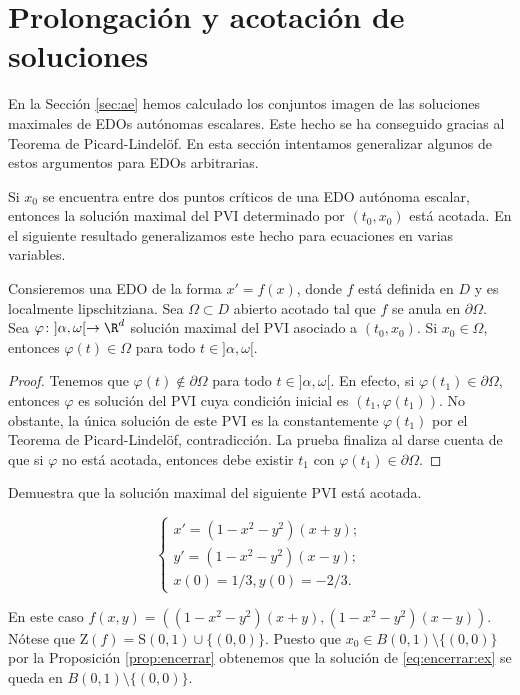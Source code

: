 \documentclass{article}
\begin{document}
\newpage

\section{Prolongación y acotación de soluciones}

En la Sección \ref{sec:ae} hemos calculado los conjuntos imagen de las soluciones maximales de EDOs
autónomas escalares. Este hecho se ha conseguido gracias al Teorema de Picard-Lindelöf. En esta
sección intentamos generalizar algunos de estos argumentos para EDOs arbitrarias.

Si $x_0$ se encuentra entre dos puntos críticos de una EDO autónoma escalar, entonces la solución
maximal del PVI determinado por $(t_0, x_0)$ está acotada. En el siguiente resultado generalizamos
este hecho para ecuaciones en varias variables.

\begin{proposition} \label{prop:encerrar} Consieremos una EDO de la forma $x' = f(x)$, donde $f$
  está definida en $D$ y es localmente lipschitziana. Sea $\Omega \subset D$ abierto acotado tal que
  $f$ se anula en $\partial\Omega$. Sea $\varphi \colon ]\alpha, \omega[ \to \R^d$ solución
  maximal del PVI asociado a $(t_0, x_0)$. Si $x_0 \in \Omega$, entonces $\varphi(t) \in \Omega$
  para todo $t \in ]\alpha, \omega[$.
\end{proposition}
\begin{proof}
  Tenemos que $\varphi(t) \not\in \partial\Omega$ para todo $t \in ]\alpha, \omega[$. En
  efecto, si $\varphi(t_1) \in \partial\Omega$, entonces $\varphi$ es solución del PVI cuya
  condición inicial es $(t_1, \varphi(t_1))$. No obstante, la única solución de este PVI es la
  constantemente $\varphi(t_1)$ por el Teorema de Picard-Lindelöf, contradicción. La prueba finaliza
  al darse cuenta de que si $\varphi$ no está acotada, entonces debe existir $t_1$ con
  $\varphi(t_1) \in \partial\Omega$.
\end{proof}

\begin{ex}
  Demuestra que la solución maximal del siguiente PVI está acotada.
  
  \begin{equation}
    \label{eq:encerrar:ex}
    \begin{cases}
      x' = (1 - x^2 - y^2) (x+y); \\
      y' = (1 - x^2 - y^2) (x-y); \\
      x(0) = 1/3, y(0) = -2/3.
    \end{cases}
  \end{equation}

  En este caso $f(x,y) = ((1 - x^2 - y^2) (x+y), (1 - x^2 - y^2) (x-y))$. Nótese que
  $\mathrm{Z}(f) = \mathrm{S}(0,1) \cup \{(0,0)\}$. Puesto que $x_0 \in B(0,1)\setminus \{(0,0)\}$
  por la Proposición \ref{prop:encerrar} obtenemos que la solución de \eqref{eq:encerrar:ex} se
  queda en $B(0,1)\setminus \{(0,0)\}$.
\end{ex}
\end{document}
